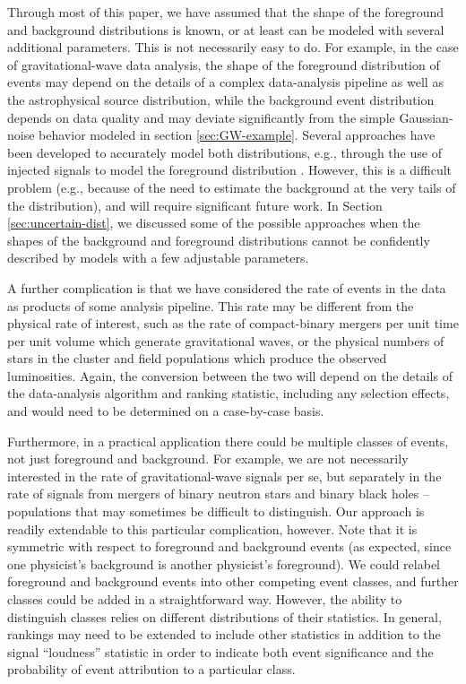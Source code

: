 \documentclass[aps,prd,reprint,nofootinbib]{revtex4-1}
\begin{document}
Through most of this paper, we have assumed that the shape of the
foreground and background distributions is known, or at least can be
modeled with several additional parameters.  This is not necessarily
easy to do.  For example, in the case of gravitational-wave data
analysis, the shape of the foreground distribution of events may
depend on the details of a complex data-analysis pipeline as well as
the astrophysical source distribution, while the background event
distribution depends on data quality and may deviate significantly
from the simple Gaussian-noise behavior modeled in section
\ref{sec:GW-example}.  Several approaches have been developed to
accurately model both distributions, e.g., through the use of injected
signals to model the foreground distribution \cite{ihope,CannonHannaKeppel:2012}.
However, this is a difficult problem (e.g., because of the need to
estimate the background at the very tails of the distribution), and
will require significant future work.  In Section \ref{sec:uncertain-dist}, 
we discussed some of the possible
approaches when the shapes of the background and foreground distributions
cannot be confidently described by models with a few adjustable parameters. 

A further complication is that we have considered the rate of events
in the data as products of some analysis pipeline.  This rate may be
different from the physical rate of interest, such as the rate of
compact-binary mergers per unit time per unit volume which generate
gravitational waves, or the physical numbers of stars in the cluster
and field populations which produce the observed luminosities.  Again,
the conversion between the two will depend on the details of the
data-analysis algorithm and ranking statistic, including any selection
effects, and would need to be determined on a case-by-case basis.

Furthermore, in a practical application there could be multiple
classes of events, not just foreground and background.  For example,
we are not necessarily interested in the rate of gravitational-wave
signals per se, but separately in the rate of signals from mergers of
binary neutron stars and binary black holes -- populations that may
sometimes be difficult to distinguish.  Our approach is readily
extendable to this particular complication, however.  Note that it is
symmetric with respect to foreground and background events (as
expected, since one physicist's background is another physicist's
foreground).  We could relabel foreground and background events into
other competing event classes, and further classes could be added in a
straightforward way.  However, the ability to distinguish classes
relies on different distributions of their statistics.  In general,
rankings may need to be extended to include other statistics in
addition to the signal ``loudness'' statistic in order to indicate
both event significance and the probability of event attribution to a
particular class.
\end{document}
